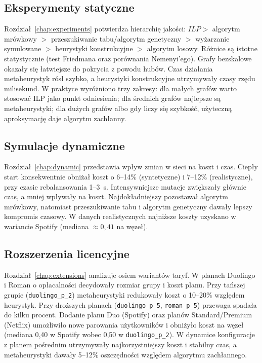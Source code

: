 \subsection{Eksperymenty statyczne}
Rozdział~\ref{chap:experiments} potwierdza hierarchię jakości: $ILP >$ algorytm mrówkowy $>$ przeszukiwanie tabu/algorytm genetyczny $>$ wyżarzanie symulowane $>$ heurystyki konstrukcyjne $>$ algorytm losowy. Różnice są istotne statystycznie (test Friedmana oraz porównania Nemenyi'ego). Grafy bezskalowe okazały się łatwiejsze do pokrycia z powodu hubów. Czas działania metaheurystyk rósł szybko, a heurystyki konstrukcyjne utrzymywały czasy rzędu milisekund. W praktyce wyróżniono trzy zakresy: dla małych grafów warto stosować ILP jako punkt odniesienia; dla średnich grafów najlepsze są metaheurystyki; dla dużych grafów albo gdy liczy się szybkość, użyteczną aproksymację daje algorytm zachłanny.

\subsection{Symulacje dynamiczne}
Rozdział~\ref{chap:dynamic} przedstawia wpływ zmian w sieci na koszt i czas. Ciepły start konsekwentnie obniżał koszt o 6--14\% (syntetyczne) i 7--12\% (realistyczne), przy czasie rebalansowania 1--3~s. Intensywniejsze mutacje zwiększały głównie czas, a mniej wpływały na koszt. Najdokładniejszy pozostawał algorytm mrówkowy, natomiast przeszukiwanie tabu i algorytm genetyczny dawały lepszy kompromis czasowy. W danych realistycznych najniższe koszty uzyskano w wariancie Spotify (mediana $\approx 0{,}41$ na węzeł).

\subsection{Rozszerzenia licencyjne}
Rozdział~\ref{chap:extensions} analizuje osiem wariantów taryf. W planach Duolingo i Roman o opłacalności decydowały rozmiar grupy i koszt planu. Przy tańszej grupie (\texttt{duolingo\_p\_2}) metaheurystyki redukowały koszt o 10--20\% względem heurystyk. Przy droższych planach (\texttt{duolingo\_p\_5}, \texttt{roman\_p\_5}) przewaga spadała do kilku procent. Dodanie planu Duo (Spotify) oraz planów Standard/Premium (Netflix) umożliwiło nowe parowania użytkowników i obniżyło koszt na węzeł (mediana 0{,}40 w Spotify wobec 0{,}50 w \texttt{duolingo\_p\_2}). W dynamice konfiguracje z planem pośrednim utrzymywały najkorzystniejszy koszt i stabilny czas, a metaheurystyki dawały 5--12\% oszczędności względem algorytmu zachłannego.

